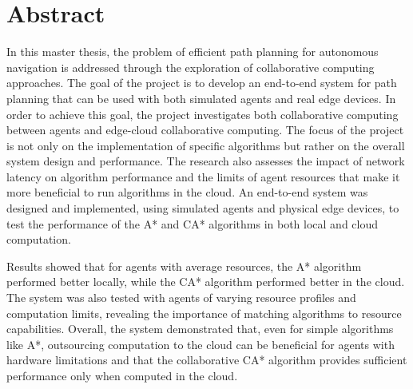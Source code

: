 \chapter{Abstract}
In this master thesis, the problem of efficient path planning for autonomous navigation is addressed through the exploration of collaborative computing approaches. The goal of the project is to develop an end-to-end system for path planning that can be used with both simulated agents and real edge devices. In order to achieve this goal, the project investigates both collaborative computing between agents and edge-cloud collaborative computing. The focus of the project is not only on the implementation of specific algorithms but rather on the overall system design and performance. The research also assesses the impact of network latency on algorithm performance and the limits of agent resources that make it more beneficial to run algorithms in the cloud. An end-to-end system was designed and implemented, using simulated agents and physical edge devices, to test the performance of the A* and CA* algorithms in both local and cloud computation.

Results showed that for agents with average resources, the A* algorithm performed better locally, while the CA* algorithm performed better in the cloud. The system was also tested with agents of varying resource profiles and computation limits, revealing the importance of matching algorithms to resource capabilities. Overall, the system demonstrated that, even for simple algorithms like A*, outsourcing computation to the cloud can be beneficial for agents with hardware limitations and that the collaborative CA* algorithm provides sufficient performance only when computed in the cloud.

